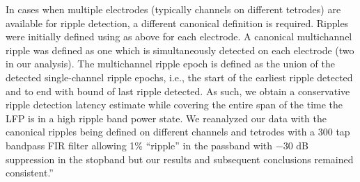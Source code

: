 In cases when multiple electrodes (typically channels on different tetrodes) are available for ripple detection, a different canonical definition is required. Ripples were initially defined using as above for each electrode. A canonical multichannel ripple was defined as one which is simultaneously detected on each electrode (two in our analysis). The multichannel ripple epoch is defined as the union of the detected single-channel ripple epochs, i.e., the start of the earliest ripple detected and to end with bound of last ripple detected. As such, we obtain a conservative ripple detection latency estimate while covering the entire span of the time the LFP is in a high ripple band power state. We reanalyzed our data with the canonical ripples being defined on different channels and tetrodes with a 300 tap bandpass FIR filter allowing 1\% “ripple” in the passband with −30 dB suppression in the stopband but our results and subsequent conclusions remained consistent.'' \cite{Dutta2018}
